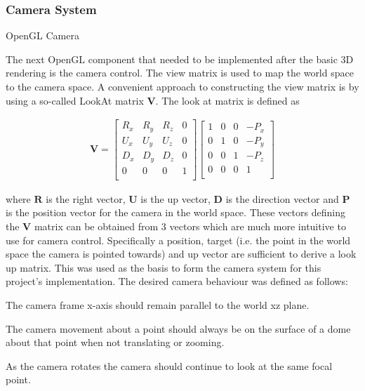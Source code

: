 \subsubsection{Camera System}

OpenGL Camera

The next OpenGL component that needed to be implemented after the basic 3D rendering is the camera control. The view matrix is used to map the world space to the camera space. A convenient approach to constructing the view matrix is by using a so-called LookAt matrix $\boldsymbol{V}$. The look at matrix is defined as

\begin{align}
	\boldsymbol{V}=
	\begin{bmatrix}
		R_x & R_y & R_z & 0 \\
		U_x & U_y & U_z & 0 \\
		D_x & D_y & D_z & 0 \\
		0 & 0 & 0 & 1 \\
	\end{bmatrix}
	\begin{bmatrix}
		1 & 0 & 0 & -P_x \\
		0 & 1 & 0 & -P_y \\
		0 & 0 & 1 & -P_z \\
		0 & 0 & 0 & 1 \\
	\end{bmatrix}
\end{align}

where $\boldsymbol{R}$ is the right vector, $\boldsymbol{U}$ is the up vector, $\boldsymbol{D}$ is the direction vector and $\boldsymbol{P}$ is the position vector for the camera in the world space. These vectors defining the $\boldsymbol{V}$ matrix can be obtained from 3 vectors which are much more intuitive to use for camera control. Specifically a position, target (i.e. the point in the world space the camera is pointed towards) and up vector are sufficient to derive a look up matrix. This was used as the basis to form the camera system for this project's implementation. The desired camera behaviour was defined as follows:

\begin{compactitem}
	\item The camera frame x-axis should remain parallel to the world xz plane.
	\item The camera movement about a point should always be on the surface of a dome about that point when not translating or zooming.
	\item As the camera rotates the camera should continue to look at the same focal point.
\end{compactitem}

